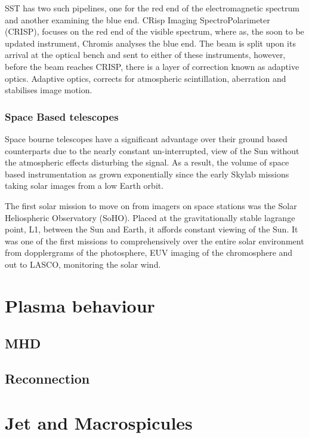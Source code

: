 SST has two such pipelines, one for the red end of the electromagnetic spectrum and another examining the blue end.
CRisp Imaging SpectroPolarimeter (CRISP), focuses on the red end of the visible spectrum, where as, the soon to be updated instrument, Chromis analyses the blue end.
The beam is split upon its arrival at the optical bench and sent to either of these instruments, however, before the beam reaches CRISP, there is a layer of correction known as adaptive optics.
Adaptive optics, corrects for atmospheric scintillation, aberration and stabilises image motion.



\subsubsection{Space Based telescopes}

Space bourne telescopes have a significant advantage over their ground based counterparts due to the nearly constant un-interrupted, view of the Sun without the atmospheric effects disturbing the signal.
As a result, the volume of space based instrumentation as grown exponentially since the early Skylab missions taking solar images from a low Earth orbit.

The first solar mission to move on from imagers on space stations was the Solar Heliospheric Observatory (SoHO).
Placed at the gravitationally stable lagrange point, L1, between the Sun and Earth, it affords constant viewing of the Sun.
It was one of the first missions to comprehensively over the entire solar environment from dopplergrams of the photosphere, EUV imaging of the chromosphere and out to LASCO, monitoring the solar wind.

\section{Plasma behaviour}

\subsection{MHD}

\subsection{Reconnection}

\section{Jet and Macrospicules}

